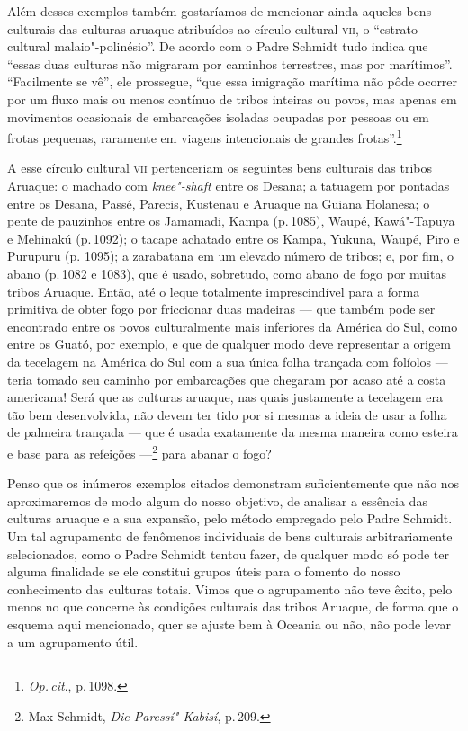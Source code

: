 Além desses exemplos também gostaríamos de mencionar ainda aqueles bens
culturais das culturas aruaque atribuídos ao círculo cultural \textsc{vii}, o
``estrato cultural malaio"-polinésio''. De acordo com o Padre Schmidt
tudo indica que ``essas duas culturas não migraram por caminhos
terrestres, mas por marítimos''. ``Facilmente se vê'', ele prossegue,
``que essa imigração marítima não pôde ocorrer por um fluxo mais ou
menos contínuo de tribos inteiras ou povos, mas apenas em movimentos
ocasionais de embarcações isoladas ocupadas por pessoas ou em frotas
pequenas, raramente em viagens intencionais de grandes
frotas''.\footnote{\textit{Op.\,cit}., p.\,1098.}

A esse círculo cultural \textsc{vii} pertenceriam os seguintes bens culturais das
tribos Aruaque: o machado com \textit{knee"-shaft}
entre os Desana; a tatuagem por pontadas entre os Desana, Passé, Parecis,
Kustenau e Aruaque na Guiana Holanesa; o pente de pauzinhos entre os
Jamamadi, Kampa (p.\,1085), Waupé, Kawá"-Tapuya e Mehinakú (p.\,1092); o
tacape achatado entre os Kampa, Yukuna, Waupé, Piro e Purupuru (p.
1095); a zarabatana em um elevado número de tribos; e, por fim, o abano
(p.\,1082 e 1083), que é usado, sobretudo, como abano de fogo por muitas
tribos Aruaque. Então, até o leque totalmente imprescindível para a
forma primitiva de obter fogo por friccionar duas madeiras ---
que também pode ser encontrado entre os
povos culturalmente mais inferiores da América do Sul, como entre os
Guató, por exemplo, e que de qualquer modo deve representar a origem da
tecelagem na América do Sul com a sua única folha trançada com folíolos
--- teria tomado seu caminho por embarcações que chegaram por acaso até a
costa americana! Será que as culturas aruaque, nas quais justamente a
tecelagem era tão bem desenvolvida, não devem ter tido por si mesmas a
ideia de usar a folha de palmeira trançada --- que é usada exatamente da
mesma maneira como esteira e base para as refeições ---\footnote{Max
  Schmidt, \textit{Die Paressí"-Kabisí}, p.\,209.}  para abanar o
fogo?


Penso que os inúmeros exemplos citados demonstram suficientemente que
não nos aproximaremos de modo algum do nosso objetivo, de analisar a
essência das culturas aruaque e a sua expansão, pelo método empregado
pelo Padre Schmidt. Um tal agrupamento de fenômenos individuais de bens
culturais arbitrariamente selecionados, como o Padre Schmidt tentou
fazer, de qualquer modo só pode ter alguma finalidade se ele constitui
grupos úteis para o fomento do nosso conhecimento das culturas totais.
Vimos que o agrupamento não teve êxito, pelo menos no que concerne às
condições culturais das tribos Aruaque, de forma que o esquema aqui
mencionado, quer se ajuste bem à Oceania ou não, não pode levar a um
agrupamento útil.

